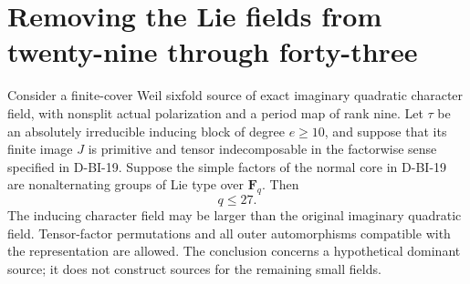\section{Removing the Lie fields from twenty-nine through forty-three}
\label{sec:lie-small-fields}

\begin{theorem}
\label{D-BI-20}
Consider a finite-cover Weil sixfold source of exact imaginary
quadratic character field, with nonsplit actual polarization and a
period map of rank nine.  Let $\tau$ be an absolutely irreducible
inducing block of degree $e\ge10$, and suppose that its finite image
$J$ is primitive and tensor indecomposable in the factorwise sense
specified in D-BI-19.  Suppose the simple factors of the normal core
in D-BI-19 are nonalternating groups of Lie type over $\mathbf F_q$.
Then
\[
                              q\le27.                       \tag{BI.72}
\]
The inducing character field may be larger than the original
imaginary quadratic field.  Tensor-factor permutations and all
outer automorphisms compatible with the representation are allowed.
The conclusion concerns a hypothetical dominant source; it does not
construct sources for the remaining small fields.
\end{theorem}

